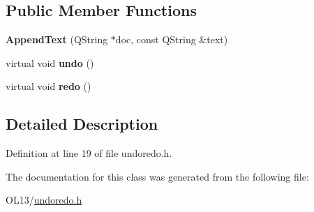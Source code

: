 \subsection*{Public Member Functions}
\begin{DoxyCompactItemize}
\item 
\mbox{\label{class_append_text_a1f053473808df00e83d26566b5be19cd}} 
{\bfseries Append\+Text} (Q\+String $\ast$doc, const Q\+String \&text)
\item 
\mbox{\label{class_append_text_a9289ddb9645f35cc98e05e77d96ca093}} 
virtual void {\bfseries undo} ()
\item 
\mbox{\label{class_append_text_a552142d5909b416eadbb4f6f728cb9d6}} 
virtual void {\bfseries redo} ()
\end{DoxyCompactItemize}


\subsection{Detailed Description}


Definition at line 19 of file undoredo.\+h.



The documentation for this class was generated from the following file\+:\begin{DoxyCompactItemize}
\item 
O\+L13/\hyperlink{undoredo_8h}{undoredo.\+h}\end{DoxyCompactItemize}

